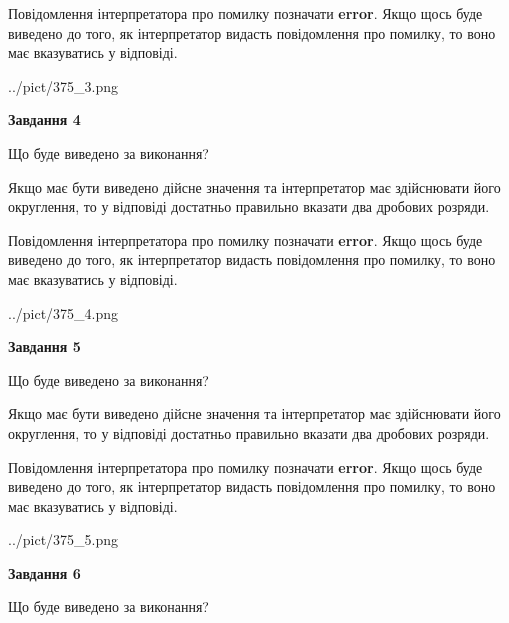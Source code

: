 \documentclass[12pt, ukrainian]{article}
\begin{document}
{\begin {Large}
Повідомлення інтерпретатора про помилку позначати \textbf{error}.
Якщо щось буде виведено до того, як інтерпретатор видасть повідомлення про помилку, 
то воно має вказуватись у відповіді. \par

\begin{center}
	{../pict/375_3.png}
\end{center}
\newpage

{\begin {center}\textbf{Завдання 4}\end {center}}\par
Що буде виведено за виконання? \par

Якщо має бути виведено дійсне значення та інтерпретатор має здійснювати його округлення, 
то у відповіді достатньо правильно вказати два дробових розряди.

Повідомлення інтерпретатора про помилку позначати \textbf{error}.
Якщо щось буде виведено до того, як інтерпретатор видасть повідомлення про помилку, 
то воно має вказуватись у відповіді. \par

\begin{center}
	{../pict/375_4.png}
\end{center}
\newpage

{\begin {center}\textbf{Завдання 5}\end {center}}\par
Що буде виведено за виконання? \par

Якщо має бути виведено дійсне значення та інтерпретатор має здійснювати його округлення, 
то у відповіді достатньо правильно вказати два дробових розряди.

Повідомлення інтерпретатора про помилку позначати \textbf{error}.
Якщо щось буде виведено до того, як інтерпретатор видасть повідомлення про помилку, 
то воно має вказуватись у відповіді. \par

\begin{center}
	{../pict/375_5.png}
\end{center}
\newpage

{\begin {center}\textbf{Завдання 6}\end {center}}\par
Що буде виведено за виконання? \par


\end{Large}}
\end{document}
